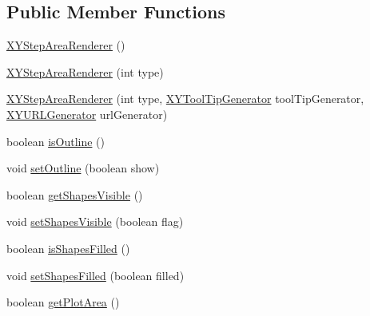 \subsection*{Public Member Functions}
\begin{DoxyCompactItemize}
\item 
\mbox{\hyperlink{classorg_1_1jfree_1_1chart_1_1renderer_1_1xy_1_1_x_y_step_area_renderer_a9753ef76e42261bd6f2fbd65d61348dd}{X\+Y\+Step\+Area\+Renderer}} ()
\item 
\mbox{\hyperlink{classorg_1_1jfree_1_1chart_1_1renderer_1_1xy_1_1_x_y_step_area_renderer_acb71882827477dade686d2c9d4034824}{X\+Y\+Step\+Area\+Renderer}} (int type)
\item 
\mbox{\hyperlink{classorg_1_1jfree_1_1chart_1_1renderer_1_1xy_1_1_x_y_step_area_renderer_aca39777f0b774a6e15abe18715c73243}{X\+Y\+Step\+Area\+Renderer}} (int type, \mbox{\hyperlink{interfaceorg_1_1jfree_1_1chart_1_1labels_1_1_x_y_tool_tip_generator}{X\+Y\+Tool\+Tip\+Generator}} tool\+Tip\+Generator, \mbox{\hyperlink{interfaceorg_1_1jfree_1_1chart_1_1urls_1_1_x_y_u_r_l_generator}{X\+Y\+U\+R\+L\+Generator}} url\+Generator)
\item 
boolean \mbox{\hyperlink{classorg_1_1jfree_1_1chart_1_1renderer_1_1xy_1_1_x_y_step_area_renderer_a4ac2c45076adb6af5706071393a11008}{is\+Outline}} ()
\item 
void \mbox{\hyperlink{classorg_1_1jfree_1_1chart_1_1renderer_1_1xy_1_1_x_y_step_area_renderer_a064e1b7e72aeda06821847fa34c98ff0}{set\+Outline}} (boolean show)
\item 
boolean \mbox{\hyperlink{classorg_1_1jfree_1_1chart_1_1renderer_1_1xy_1_1_x_y_step_area_renderer_a788e4b8ad2e8a0cafbcaace5916ff067}{get\+Shapes\+Visible}} ()
\item 
void \mbox{\hyperlink{classorg_1_1jfree_1_1chart_1_1renderer_1_1xy_1_1_x_y_step_area_renderer_a4b1baae27007b7c3ce8f0a102ddcafac}{set\+Shapes\+Visible}} (boolean flag)
\item 
boolean \mbox{\hyperlink{classorg_1_1jfree_1_1chart_1_1renderer_1_1xy_1_1_x_y_step_area_renderer_aa4918ed44e42b921f005daf48d3fe2c8}{is\+Shapes\+Filled}} ()
\item 
void \mbox{\hyperlink{classorg_1_1jfree_1_1chart_1_1renderer_1_1xy_1_1_x_y_step_area_renderer_a3a37119cd10d3facbcdb0d8bb00e9738}{set\+Shapes\+Filled}} (boolean filled)
\item 
boolean \mbox{\hyperlink{classorg_1_1jfree_1_1chart_1_1renderer_1_1xy_1_1_x_y_step_area_renderer_ac362b49cce6ba1ec752730bdfb11c590}{get\+Plot\+Area}} ()
\item 

\end{DoxyCompactItemize}

